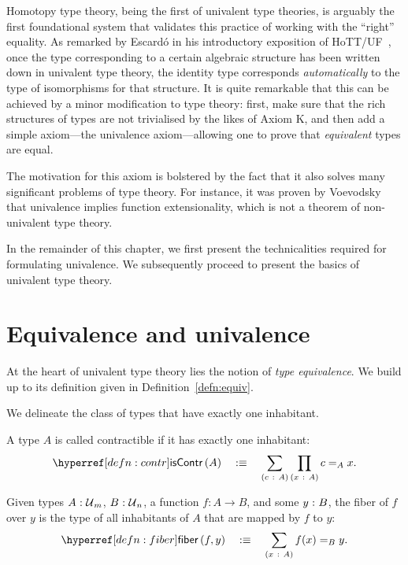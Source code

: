 Homotopy type theory, being the first of univalent type theories, is arguably the first
foundational system that validates this practice of working with the ``right'' equality.
As remarked by Escardó in his introductory exposition of HoTT/UF~\cite{escardo-uf-intro},
once the type corresponding to a certain algebraic structure has been written down in
univalent type theory, the identity type corresponds \emph{automatically} to the type of
isomorphisms for that structure. It is quite remarkable that this can be achieved by a
minor modification to type theory: first, make sure that the rich structures of types are
not trivialised by the likes of Axiom K, and then add a simple axiom---the univalence
axiom---allowing one to prove that \emph{equivalent} types are equal.

The motivation for this axiom is bolstered by the fact that it also solves many
significant problems of type theory. For instance, it was proven by Voevodsky that
univalence implies function extensionality, which is not a theorem of non-univalent type
theory.

In the remainder of this chapter, we first present the technicalities required for
formulating univalence. We subsequently proceed to present the basics of univalent type
theory.

\section{Equivalence and univalence}

At the heart of univalent type theory lies the notion of \emph{type equivalence}. We build
up to its definition given in Definition~\ref{defn:equiv}.

We delineate the class of types that have exactly one inhabitant.
\begin{defn}[Contractible]\label{defn:contr}
  A type $A$ is called contractible if it has exactly one inhabitant:
  \begin{equation*}
    \iscontr{A} \quad\is\quad \sigmaty{c}{A}{\pity{x}{A}{c =_A x}}.
  \end{equation*}
\end{defn}

\begin{defn}[Fiber]\label{defn:fiber}
  Given types $A\hspace{0.1mm}:\hspace{0.1mm}\mathcal{U}{}_m$, $B\hspace{0.1mm}:\hspace{0.1mm}\mathcal{U}{}_n$, a function $f : A
  \rightarrow B$, and some $y\hspace{0.1mm}:\hspace{0.1mm}B$, the fiber of $f$ over $y$ is the type of all
  inhabitants of $A$ that are mapped by $f$ to $y$:
  \begin{equation*}
    \fiber{f}{y} \quad\is\quad \sigmaty{x}{A}{f(x) =_B y}.
  \end{equation*}
\end{defn}

